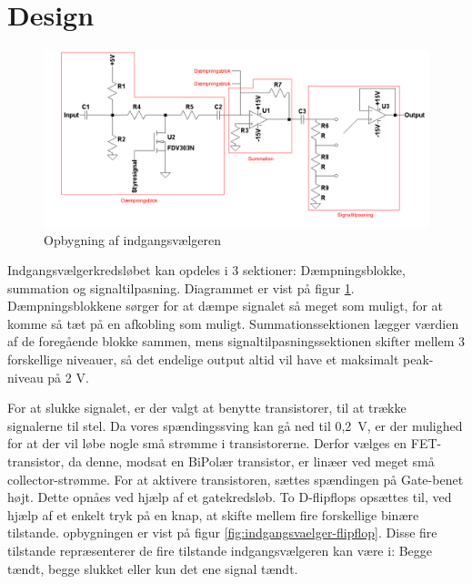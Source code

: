 \section{Design}

\begin{figure}[h]
\centering
\includegraphics[width=\textwidth]{teknisk/indgangsvaelger/signal-taend-sluk.png}
\caption{Opbygning af indgangsvælgeren}
\label{fig:indgangsvaelger-overordnet}
\end{figure}

Indgangsvælgerkredsløbet kan opdeles i 3 sektioner: Dæmpningsblokke, summation og signaltilpasning. Diagrammet er vist på figur \ref{fig:indgangsvaelger-overordnet}. Dæmpningsblokkene sørger for at dæmpe signalet så meget som muligt, for at komme så tæt på en afkobling som muligt. Summationssektionen lægger værdien af de foregående blokke sammen, mens signaltilpasningssektionen skifter mellem 3 forskellige niveauer, så det endelige output altid vil have et maksimalt peak-niveau på 2 V.  

For at slukke signalet, er der valgt at benytte transistorer, til at trække signalerne til stel. Da vores spændingssving kan gå ned til 0,2~V, er der mulighed for at der vil løbe nogle små strømme i transistorerne. Derfor vælges en FET-transistor, da denne, modsat en BiPolær transistor, er linæer ved meget små collector-strømme. For at aktivere transistoren, sættes spændingen på Gate-benet højt. Dette opnåes ved hjælp af et gatekredsløb. To D-flipflops opsættes til, ved hjælp af et enkelt tryk på en knap, at skifte mellem fire forskellige binære tilstande. opbygningen er vist på figur \ref{fig:indgangsvaelger-flipflop}. Disse fire tilstande repræsenterer de fire tilstande indgangsvælgeren kan være i: Begge tændt, begge slukket eller kun det ene signal tændt.

